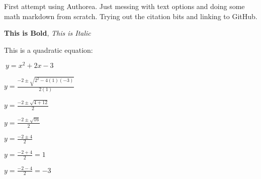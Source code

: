 First attempt using Authorea. Just messing with text options and doing some math markdown from scratch. Trying out the citation bits and linking to GitHub.

\textbf{This is Bold}, \textit{This is Italic}

This is a quadratic equation:

$\ y = x^{2} + 2x -3 $


$ y = \frac{-2 \pm \sqrt{2^{2}-4(1)(-3)}}{2(1)}$

$ y = \frac{-2 \pm \sqrt{4+12}}{2}$

$ y = \frac{-2 \pm \sqrt{16}}{2}$

$ y = \frac{-2 \pm {4}}{2}$

$ y = \frac{-2 + {4}}{2} = 1$

$ y = \frac{-2 - {4}}{2} = -3$